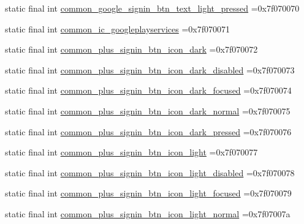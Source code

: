 \begin{DoxyCompactItemize}
static final int \mbox{\hyperlink{classbr_1_1unb_1_1cic_1_1mp_1_1marketmaster_1_1R_1_1drawable_a2c5002327bf658393960a1f526f81b00}{common\+\_\+google\+\_\+signin\+\_\+btn\+\_\+text\+\_\+light\+\_\+pressed}} =0x7f070070
\item 
static final int \mbox{\hyperlink{classbr_1_1unb_1_1cic_1_1mp_1_1marketmaster_1_1R_1_1drawable_a3a693d2048f9eff0dd451665b86543c4}{common\+\_\+ic\+\_\+googleplayservices}} =0x7f070071
\item 
static final int \mbox{\hyperlink{classbr_1_1unb_1_1cic_1_1mp_1_1marketmaster_1_1R_1_1drawable_a46c622f2934919a2e205c791dbefd5be}{common\+\_\+plus\+\_\+signin\+\_\+btn\+\_\+icon\+\_\+dark}} =0x7f070072
\item 
static final int \mbox{\hyperlink{classbr_1_1unb_1_1cic_1_1mp_1_1marketmaster_1_1R_1_1drawable_ad2b964c5f2a82b30e44bb672bec025cf}{common\+\_\+plus\+\_\+signin\+\_\+btn\+\_\+icon\+\_\+dark\+\_\+disabled}} =0x7f070073
\item 
static final int \mbox{\hyperlink{classbr_1_1unb_1_1cic_1_1mp_1_1marketmaster_1_1R_1_1drawable_a3162207acd5b67a6a30c2af3edbe5d00}{common\+\_\+plus\+\_\+signin\+\_\+btn\+\_\+icon\+\_\+dark\+\_\+focused}} =0x7f070074
\item 
static final int \mbox{\hyperlink{classbr_1_1unb_1_1cic_1_1mp_1_1marketmaster_1_1R_1_1drawable_a6e614e4cdadbdf59b37f71b8389cb64e}{common\+\_\+plus\+\_\+signin\+\_\+btn\+\_\+icon\+\_\+dark\+\_\+normal}} =0x7f070075
\item 
static final int \mbox{\hyperlink{classbr_1_1unb_1_1cic_1_1mp_1_1marketmaster_1_1R_1_1drawable_af1281a03016b821dcdb3307382290e39}{common\+\_\+plus\+\_\+signin\+\_\+btn\+\_\+icon\+\_\+dark\+\_\+pressed}} =0x7f070076
\item 
static final int \mbox{\hyperlink{classbr_1_1unb_1_1cic_1_1mp_1_1marketmaster_1_1R_1_1drawable_aad112a976604f5ffc834cfae86cc3f7b}{common\+\_\+plus\+\_\+signin\+\_\+btn\+\_\+icon\+\_\+light}} =0x7f070077
\item 
static final int \mbox{\hyperlink{classbr_1_1unb_1_1cic_1_1mp_1_1marketmaster_1_1R_1_1drawable_a7e11c348add8d1751e8ba54a80947758}{common\+\_\+plus\+\_\+signin\+\_\+btn\+\_\+icon\+\_\+light\+\_\+disabled}} =0x7f070078
\item 
static final int \mbox{\hyperlink{classbr_1_1unb_1_1cic_1_1mp_1_1marketmaster_1_1R_1_1drawable_aed1eb5267048d2ef213ce54014f97d64}{common\+\_\+plus\+\_\+signin\+\_\+btn\+\_\+icon\+\_\+light\+\_\+focused}} =0x7f070079
\item 
static final int \mbox{\hyperlink{classbr_1_1unb_1_1cic_1_1mp_1_1marketmaster_1_1R_1_1drawable_a70f818f89511218ba704d62c67a1015b}{common\+\_\+plus\+\_\+signin\+\_\+btn\+\_\+icon\+\_\+light\+\_\+normal}} =0x7f07007a

\end{DoxyCompactItemize}
